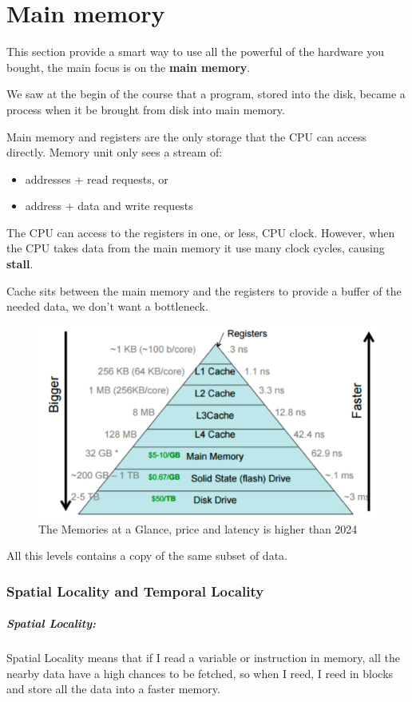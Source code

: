 \chapter{Main memory}

This section provide a smart way to use all the powerful of the hardware you bought, the main focus is on the \textbf{main memory}. 

We saw at the begin of the course that a program, stored into the disk, became a process when it be brought from disk into main memory. 

Main memory and registers are the only storage that the CPU can access directly. Memory unit only sees a stream of:

\begin{itemize}
    \item addresses + read requests, or
    \item address + data and write requests
\end{itemize}

The CPU can access to the registers in one, or less, CPU clock. However, when the CPU takes data from the main memory it use many clock cycles, causing \textbf{stall}.

Cache sits between the main memory and the registers to provide a buffer of the needed data, we don't want a bottleneck.

\begin{figure}[htbp]
    \centering
    \includegraphics[width=0.6\linewidth]{img/memory.png}
    \caption{The Memories at a Glance, price and latency is higher than 2024 }
\end{figure}

All this levels contains a copy of the same subset of data.

\newpage
\subsection{Spatial Locality and Temporal Locality}

\paragraph{Spatial Locality:} Spatial Locality means that if I read a variable or instruction in memory, all the nearby data have a high chances to be fetched, so when I reed, I reed in blocks and store all the data into a faster memory.

